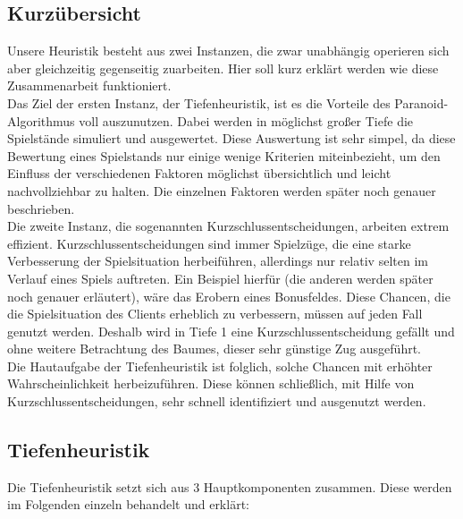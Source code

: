 \documentclass[12pt,a4paper,bibliography=totocnumbered,listof=totocnumbered,ngerman]{scrartcl}
\begin{document}
\subsection{Kurzübersicht}
Unsere Heuristik besteht aus zwei Instanzen, die zwar unabhängig operieren sich aber gleichzeitig gegenseitig zuarbeiten. Hier soll kurz erklärt werden wie diese Zusammenarbeit funktioniert. \\
Das Ziel der ersten Instanz, der Tiefenheuristik, ist es die Vorteile des Paranoid-Algorithmus voll auszunutzen. Dabei werden in möglichst großer Tiefe die Spielstände simuliert und ausgewertet. Diese Auswertung ist sehr simpel, da diese Bewertung eines Spielstands nur einige wenige Kriterien miteinbezieht, um den Einfluss der verschiedenen Faktoren möglichst übersichtlich und leicht nachvollziehbar zu halten. Die einzelnen Faktoren werden später noch genauer beschrieben.\\
Die zweite Instanz, die sogenannten Kurzschlussentscheidungen, arbeiten extrem effizient. Kurzschlussentscheidungen sind immer Spielzüge, die eine starke Verbesserung der Spielsituation herbeiführen, allerdings nur relativ selten im Verlauf eines Spiels auftreten. Ein Beispiel hierfür (die anderen werden später noch genauer erläutert), wäre das Erobern eines Bonusfeldes. Diese Chancen, die die Spielsituation des Clients erheblich zu verbessern, müssen auf jeden Fall genutzt werden. Deshalb wird in Tiefe 1 eine Kurzschlussentscheidung gefällt und ohne weitere Betrachtung des Baumes, dieser sehr günstige Zug ausgeführt.\\
Die Hautaufgabe der Tiefenheuristik ist folglich, solche Chancen mit erhöhter Wahrscheinlichkeit herbeizuführen. Diese können schließlich, mit Hilfe von Kurzschlussentscheidungen, sehr schnell identifiziert und ausgenutzt werden.\\


\subsection{Tiefenheuristik}
  
Die Tiefenheuristik setzt sich aus 3 Hauptkomponenten zusammen. Diese werden im Folgenden einzeln behandelt und erklärt:\\
 
\end{document}
